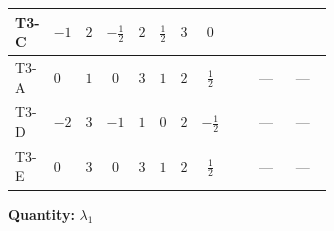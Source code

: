 \documentclass[8pt]{article}
\begin{document}
\begin{landscape}
\begin{longtable}{@{}llcccccc >{\raggedright\arraybackslash}p{0.21\linewidth} >{\raggedright\arraybackslash}p{0.21\linewidth} >{\raggedright\arraybackslash}p{0.21\linewidth}@{}}
T3-C & $-1$ & $2$ & $-\frac{1}{2}$ & $2$ & $\frac{1}{2}$ & $3$ & $0$ & \scriptsize\adjustbox{max width=\linewidth}{$\begin{gathered} -12 \operatorname{Tr}\!\left({Y_u}\,\left({Y_u}\right)^{\dagger}\,{Y_u}\,\left({Y_u}\right)^{\dagger}\right)\end{gathered}$} & \scriptsize\adjustbox{max width=\linewidth}{$\begin{gathered} +8 {\lambda_7} \left({\lambda_7}\right)^{*}\end{gathered}$} & \scriptsize\adjustbox{max width=\linewidth}{$\begin{gathered} +4 {\lambda_{H H^\dagger S_1^\dagger S_2^\dagger}^{\rm Cross}} \left({\lambda_{H H^\dagger S_1^\dagger S_2^\dagger}^{\rm Cross}}\right)^{*}\end{gathered}$} \\
\midrule
T3-A & $0$ & $1$ & $0$ & $3$ & $1$ & $2$ & $\frac{1}{2}$ & \scriptsize\adjustbox{max width=\linewidth}{$\begin{gathered} -12 \operatorname{Tr}\!\left({Y_u}\,\left({Y_u}\right)^{\dagger}\,{Y_u}\,\left({Y_u}\right)^{\dagger}\right)\end{gathered}$} & --- & --- \\
\midrule
T3-D & $-2$ & $3$ & $-1$ & $1$ & $0$ & $2$ & $-\frac{1}{2}$ & \scriptsize\adjustbox{max width=\linewidth}{$\begin{gathered} -12 \operatorname{Tr}\!\left({Y_u}\,\left({Y_u}\right)^{\dagger}\,{Y_u}\,\left({Y_u}\right)^{\dagger}\right)\end{gathered}$} & --- & --- \\
\midrule
T3-E & $0$ & $3$ & $0$ & $3$ & $1$ & $2$ & $\frac{1}{2}$ & \scriptsize\adjustbox{max width=\linewidth}{$\begin{gathered} -12 \operatorname{Tr}\!\left({Y_u}\,\left({Y_u}\right)^{\dagger}\,{Y_u}\,\left({Y_u}\right)^{\dagger}\right)\end{gathered}$} & --- & --- \\
\midrule
\bottomrule
\end{longtable}
\clearpage
\noindent\textbf{Quantity: }$\lambda_1$\par\smallskip

\end{landscape}
\end{document}

